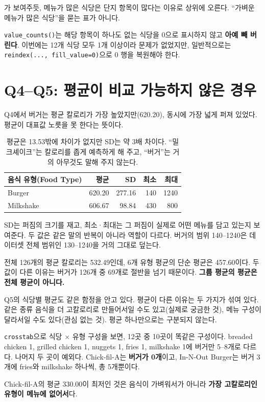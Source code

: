 가 보여주듯, 메뉴가 많은 식당은 단지 항목이 많다는 이유로
상위에 오른다. ``가벼운 메뉴가 많은 식당''을 묻는 표가 아니다.

\begin{pitfall}
\texttt{value\_counts()}는 해당 항목이 하나도 없는 식당을 0으로 표시하지 않고 \textbf{아예
빼 버린다}. 이번에는 12개 식당 모두 1개 이상이라 문제가 없었지만, 일반적으로는
\texttt{reindex(..., fill\_value=0)}으로 0 행을 복원해야 한다.
\end{pitfall}

\section{Q4--Q5: 평균이 비교 가능하지 않은 경우}
\label{sec:hw1-q45}

Q4에서 버거는 평균 칼로리가 가장 높았지만(620.20), 동시에 가장 넓게 퍼져 있었다.
평균이 대표값 노릇을 못 한다는 뜻이다.

\begin{table}[H]
\centering
\begin{tabular}{lrrrr}
\toprule
음식 유형(Food Type) & 평균 & SD & 최소 & 최대 \\
\midrule
Burger    & 620.20 & 277.16 & 140 & 1240 \\
\midrule
Milkshake & 606.67 & 98.84  & 430 & 800  \\
\bottomrule
\end{tabular}
\caption{평균은 13.53밖에 차이가 없지만 SD는 약 3배 차이다. ``밀크셰이크''는 칼로리를
좁게 예측하게 해 주고, ``버거''는 거의 아무것도 말해 주지 않는다.}
\label{tab:hw1-burger-vs-shake}
\end{table}

SD는 퍼짐의 크기를 재고, 최소·최대는 그 퍼짐이 실제로 어떤 메뉴를 담고 있는지 보여준다.
두 값은 같은 말의 반복이 아니라 역할이 다르다. 버거의 범위 140--1240은 데이터셋 전체
범위인 130--1240을 거의 그대로 덮는다.

전체 126개의 평균 칼로리는 532.49인데, 6개 유형 평균의 단순 평균은 457.60이다. 두 값이
다른 이유는 버거가 126개 중 69개로 절반을 넘기 때문이다. \textbf{그룹 평균의 평균은
전체 평균이 아니다.}

Q5의 식당별 평균도 같은 함정을 안고 있다. 평균이 다른 이유는 두 가지가 섞여 있다.
같은 종류 음식을 더 고칼로리로 만들어서일 수도 있고(실제로 궁금한 것), 메뉴 구성이
달라서일 수도 있다(관심 없는 것). 평균 하나만으로는 구분되지 않는다.

\begin{example}
\label{ex:hw1-menu-mix}
\texttt{crosstab}으로 식당 $\times$ 유형 구성을 보면, 12곳 중 10곳이 똑같은 구성이다.
breaded chicken 1, grilled chicken 1, nuggets 1, fries 1, milkshake 1에 버거만 5--8개로
다르다. 나머지 두 곳이 예외다. Chick-fil-A는 \textbf{버거가 0개}이고, In-N-Out Burger는
버거 3개에 fries와 milkshake 하나씩, 총 5개뿐이다.

Chick-fil-A의 평균 330.00이 최저인 것은 음식이 가벼워서가 아니라 \textbf{가장 고칼로리인
유형이 메뉴에 없어서}다.
\end{example}

